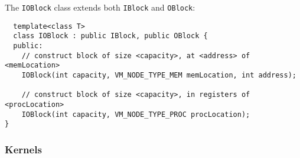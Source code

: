 \noindent The {\tt IOBlock} class extends both {\tt IBlock} and {\tt OBlock}:

{\small
\begin{verbatim}
  template<class T>
  class IOBlock : public IBlock, public OBlock {
  public:
    // construct block of size <capacity>, at <address> of <memLocation>
    IOBlock(int capacity, VM_NODE_TYPE_MEM memLocation, int address);

    // construct block of size <capacity>, in registers of <procLocation>
    IOBlock(int capacity, VM_NODE_TYPE_PROC procLocation);
}
\end{verbatim}}

\subsubsection{Kernels}
\label{sec:kernels}

